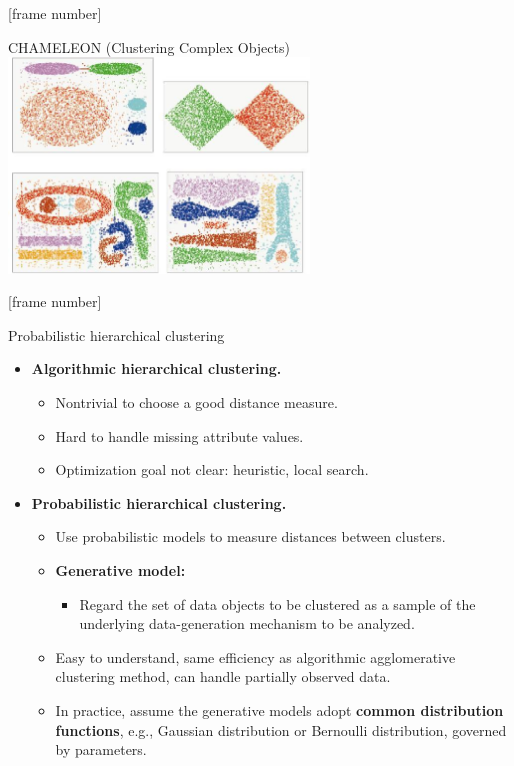 \documentclass[aspectratio=169,t,xcolor=dvipsnames]{beamer}
\begin{document}
  {
    [frame number]
    \begin{frame}{CHAMELEON (Clustering Complex Objects)}
      \centering
      \includegraphics[width=0.6\textwidth]{img/cluster.jpeg}
    \end{frame}
  }

  {
    [frame number]
    \begin{frame}{Probabilistic hierarchical clustering}
      \centering
      \begin{itemize}
        \item \textbf{Algorithmic hierarchical clustering.}
        \begin{itemize}
          \item Nontrivial to choose a good distance measure.
          \item Hard to handle missing attribute values.
          \item Optimization goal not clear: heuristic, local search.
        \end{itemize}
        \item \textbf{Probabilistic hierarchical clustering.}
        \begin{itemize}
          \item Use probabilistic models to measure distances between clusters.
          \item \textbf{\color{airforceblue}Generative model:}
          \begin{itemize}
            \item Regard the set of data objects to be clustered as a sample of the underlying data-generation mechanism to be analyzed.
          \end{itemize}
          \item Easy to understand, same efficiency as algorithmic agglomerative clustering method, can handle partially observed data.
          \item In practice, assume the generative models adopt \textbf{\color{airforceblue}common distribution functions}, e.g., Gaussian distribution or Bernoulli distribution, governed by parameters.
        \end{itemize}
      \end{itemize}
    \end{frame}
  }
\end{document}
